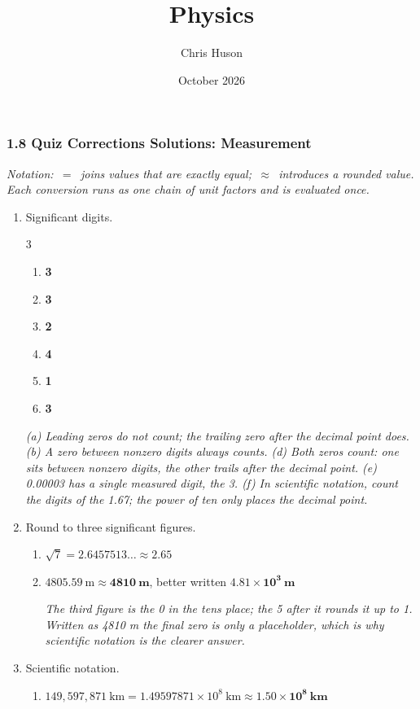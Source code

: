 \documentclass[12pt, twoside]{article}
\title{Physics}
\author{Chris Huson}
\date{October 2026}
\begin{document}
\subsubsection*{1.8 Quiz Corrections Solutions: Measurement}

\emph{Notation: \,$=$\, joins values that are exactly equal; \,$\approx$\, introduces a
rounded value. Each conversion runs as one chain of unit factors and is evaluated once.}

\begin{enumerate}[itemsep=0.25cm]

\item Significant digits.
  \begin{multicols}{3}
    \begin{enumerate}[itemsep=0.1cm]
      \item \textbf{3}
      \item \textbf{3}
      \item \textbf{2}
      \item \textbf{4}
      \item \textbf{1}
      \item \textbf{3}
    \end{enumerate}
  \end{multicols}
  \emph{(a) Leading zeros do not count; the trailing zero after the decimal point does.
  (b) A zero between nonzero digits always counts. (d) Both zeros count: one sits
  between nonzero digits, the other trails after the decimal point. (e) \num{0.00003}
  has a single measured digit, the 3. (f) In scientific notation, count the digits of
  the 1.67; the power of ten only places the decimal point.}

\item Round to three significant figures.
  \begin{enumerate}[itemsep=0.15cm]
    \item $\sqrt{7} = 2.6457513\ldots \approx \mathbf{2.65}$
    \item $4805.59~\text{m} \approx \mathbf{4810~\textbf{m}}$, better written
      $\mathbf{4.81 \times 10^{3}~\textbf{m}}$

      \emph{The third figure is the 0 in the tens place; the 5 after it rounds it up
      to 1. Written as 4810 m the final zero is only a placeholder, which is why
      scientific notation is the clearer answer.}
  \end{enumerate}

\item Scientific notation.
  \begin{enumerate}[itemsep=0.15cm]
    \item $149{,}597{,}871~\text{km} = 1.49597871 \times 10^{8}~\text{km}
      \approx \mathbf{1.50 \times 10^{8}~\textbf{km}}$


\end{enumerate}
\end{enumerate}
\end{document}
